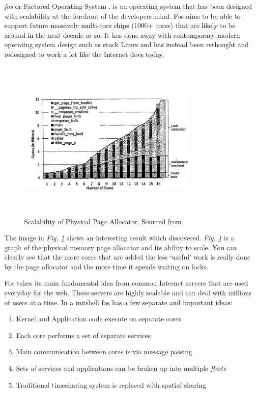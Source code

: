 \documentclass[journal]{IEEEtran}
\begin{document}
\emph{fos} or Factored Operating System \cite{fos}, is an operating system that has been designed with scalability at the forefront of the developers mind. Fos aims to be able to support future massively multi-core chips (1000+ cores) that are likely to be around in the next decade or so. It has done away with contemporary modern operating system design such as stock Linux and has instead been rethought and redesigned to work a lot like the Internet does today.

\begin{figure}
\includegraphics[width =9cm, height =8cm]{page_allocator.png}
\caption{Scalability of Physical Page Allocator. Sourced from \cite{fos}}
\label{PageAllocator}
\end{figure}

The image in \emph{Fig. \ref{PageAllocator}} shows an interesting result which \cite{fos} discovered. \emph{Fig. \ref{PageAllocator}} is a graph of the physical memory page allocator and its ability to scale. You can clearly see that the more cores that are added the less `useful' work is really done by the page allocator and the more time it spends waiting on locks. 

Fos takes its main fundamental idea from common Internet servers that are used everyday for the web. These servers are highly scalable and can deal with millions of users at a time. In a nutshell fos has a few separate and important ideas:

\vspace{2 mm}

\begin{enumerate}
\item Kernel and Application code execute on separate cores
\item Each core performs a set of separate services
\item Main communication between cores is via message passing
\item Sets of services and applications can be broken up into multiple \emph{fleets}
\item Traditional timesharing system is replaced with spatial sharing
\end{enumerate}
\end{document}
